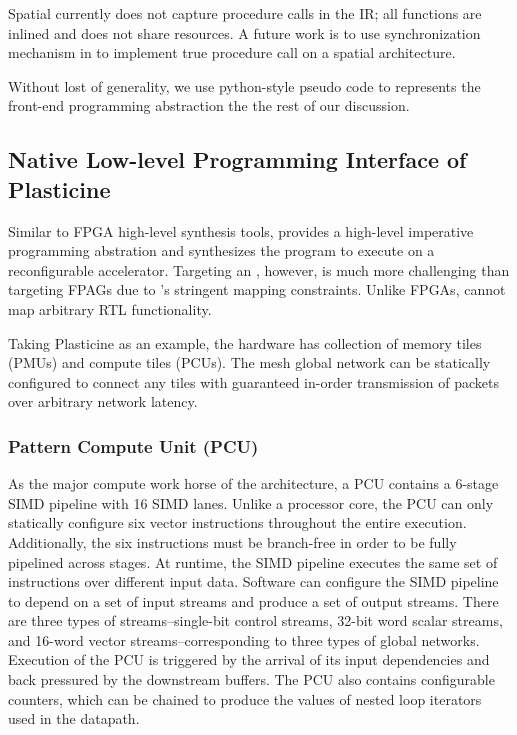 Spatial currently does not capture procedure calls in the IR; all functions are inlined and does not
share resources. A future work is to use synchronization mechanism in \name to implement true procedure
call on a spatial architecture.

Without lost of generality, we use python-style pseudo code to represents the front-end programming
abstraction the the rest of our discussion.

\subsection{Native Low-level Programming Interface of Plasticine}
Similar to FPGA high-level synthesis tools, \name provides a high-level imperative programming abstration
and synthesizes the program to execute on a reconfigurable accelerator. Targeting an \rda, however,
is much more challenging than targeting FPAGs due to \rda's stringent mapping constraints. 
Unlike FPGAs, \rdas cannot map arbitrary RTL functionality. 

Taking Plasticine as an example, 
the hardware has collection of memory tiles (PMUs) and compute tiles (PCUs). 
The mesh global network can be statically configured to connect any tiles with guaranteed in-order 
transmission of packets over arbitrary network latency.

\subsubsection{Pattern Compute Unit (PCU)}
As the major compute work horse of the architecture, a PCU contains a 6-stage SIMD pipeline with 16 SIMD lanes. 
Unlike a processor core, the PCU can only statically configure six vector instructions throughout the
entire execution.
Additionally, the six instructions must be branch-free in order to be fully pipelined across stages.
At runtime, the SIMD pipeline executes the same set of instructions over different input data.
Software can configure the SIMD pipeline to depend on a set of input streams and
produce a set of output streams. 
There are three types of streams--single-bit control streams, 32-bit word scalar streams, and
16-word vector streams--corresponding to three types of global networks.
Execution of the PCU is triggered by the arrival of its input dependencies and back pressured by
the downstream buffers.
The PCU also contains configurable counters, which can be chained to produce the values of nested
loop iterators used in the datapath. 

